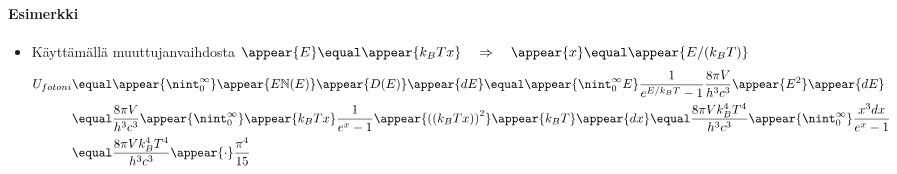 \begin{frame}
\frametitle{\texorpdfstring{\culine[\sectiontitleulinecolor]{\sectiontitle}}{\sectiontitle} }
\framesubtitle{Esimerkki}

\appear{}
\begin{itemize}

\item Käyttämällä muuttujanvaihdosta $\appear{E}  \equal \appear{k_{B} T x} \quad \Rightarrow \quad \appear{x}  \equal \appear{E/(k_{B} T)}$
\[
\begin{aligned}
U_{fotoni}  &\equal  \appear{\nint_{0}^{\infty}} \appear{E  \mathbb{N} (E)} \appear{D(E)} \appear{d E}
 \equal  
 \appear{\nint_{0}^{\infty} E} \frac{1}{e^{E / k_{B} T}-1} \frac{8 \pi V}{h^{3} c^{3}} \appear{E^{2}} \appear{d E} \\
& \equal 
\frac{8 \pi V}{h^{3} c^{3}} \appear{\nint_{0}^{\infty}} \appear{k_{B} T x} \frac{1}{e^{x}-1} \appear{\textrm{((} k_{B} T x \textrm{))} ^{2}} \appear{k_{B} T} \appear{d x}
 \equal 
 \frac{8 \pi V k_{B}^{4} T^{4}}{h^{3} c^{3}} \appear{\nint_{0}^{\infty}} \frac{x^{3} d x}{e^{x}-1}  \\
 &\equal 
 \frac{8 \pi V k_{B}^{4} T^{4}}{h^{3} c^{3}} \appear{\cdot} \frac{\pi^{4}}{15}
\end{aligned}
\]
\end{itemize}


\endofslide 
\end{frame}

